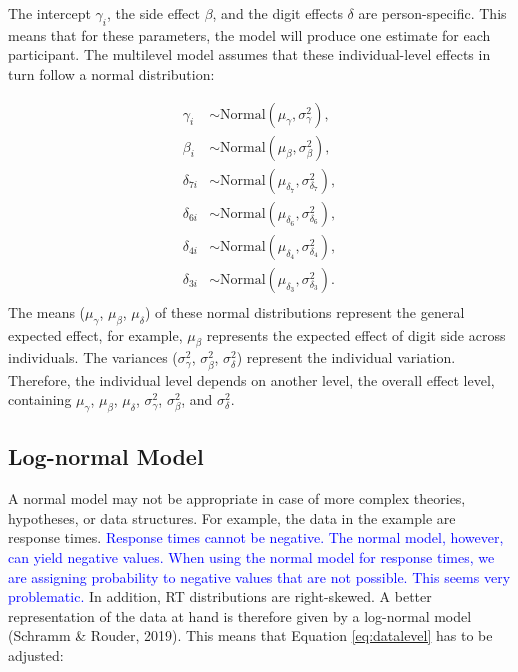 \documentclass[
  english,
  doc,floatsintext]{apa6}
\begin{document}
The intercept \(\gamma_i\), the side effect \(\beta\), and the digit effects \(\delta\) are person-specific. This means that for these parameters, the model will produce one estimate for each participant. The multilevel model assumes that these individual-level effects in turn follow a normal distribution:

\begin{equation}
\begin{aligned}
\gamma_{i} &\sim \text{Normal}(\mu_{\gamma}, \sigma^2_{\gamma}), \label{eq:fixedvsrandom}\\
\beta_{i} &\sim \text{Normal}(\mu_{\beta}, \sigma^2_{\beta}), \\
\delta_{7i} &\sim \text{Normal}(\mu_{\delta_{7}}, \sigma^2_{\delta_{7}}), \\
\delta_{6i} &\sim \text{Normal}(\mu_{\delta_{6}}, \sigma^2_{\delta_{6}}), \\
\delta_{4i} &\sim \text{Normal}(\mu_{\delta_{4}}, \sigma^2_{\delta_{4}}),\\
\delta_{3i} &\sim \text{Normal}(\mu_{\delta_{3}}, \sigma^2_{\delta_{3}}).\\
\end{aligned}
\end{equation}
The means (\(\mu_{\gamma}\), \(\mu_{\beta}\), \(\mu_{\delta}\)) of these normal distributions represent the general expected effect, for example, \(\mu_{\beta}\) represents the expected effect of digit side across individuals. The variances (\(\sigma^2_{\gamma}\), \(\sigma^2_{\beta}\), \(\sigma^2_{\delta}\)) represent the individual variation. Therefore, the individual level depends on another level, the overall effect level, containing \(\mu_{\gamma}\), \(\mu_{\beta}\), \(\mu_{\delta}\), \(\sigma^2_{\gamma}\), \(\sigma^2_{\beta}\), and \(\sigma^2_{\delta}\).

\hypertarget{log-normal-model}{%
\subsection{Log-normal Model}\label{log-normal-model}}

A normal model may not be appropriate in case of more complex theories, hypotheses, or data structures. For example, the data in the example are response times. \textcolor{blue}{Response times cannot be negative. The normal model, however, can yield negative values. When using the normal model for response times, we are assigning probability to negative values that are not possible. This seems very problematic.} In addition, RT distributions are right-skewed. A better representation of the data at hand is therefore given by a log-normal model (Schramm \& Rouder, 2019). This means that Equation \eqref{eq:datalevel} has to be adjusted:
\end{document}

